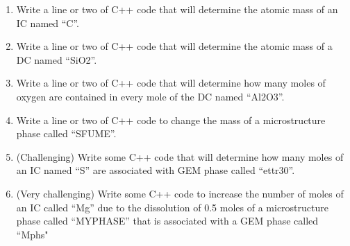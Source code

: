 \documentclass{article}
\begin{document}
\begin{enumerate}
    \item Write a line or two of C++ code that will determine the atomic mass of
        an IC named ``C''.
    \item Write a line or two of C++ code that will determine the atomic mass of
        a DC named ``SiO2''.
    \item Write a line or two of C++ code that will determine how many moles of
        oxygen are contained in every mole of the DC named ``Al2O3''.
    \item Write a line or two of C++ code to change the mass of a microstructure phase called
        ``SFUME''.
    \item (Challenging) Write some C++ code that will determine how many moles
        of an IC named ``S'' are associated with GEM phase called ``ettr30''.
    \item (Very challenging) Write some C++ code to increase the number of moles of an IC
        called ``Mg'' due to the dissolution of 0.5 moles of a microstructure phase
        called ``MYPHASE'' that is associated with a GEM phase called ``Mphs"
\end{enumerate}
\end{document}
